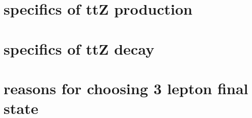 	\section{specifics of ttZ production}
	\section{specifics of ttZ decay}
	\section{reasons for choosing 3 lepton final state}